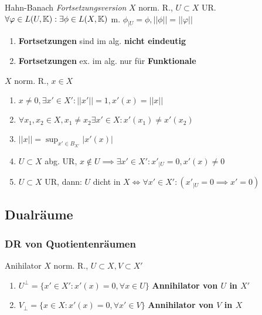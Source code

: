 \begin{satz}{Hahn-Banach \textit{Fortsetzungsversion}}
  $X$ norm. R., $U\subset X$ UR. $\forall \varphi \in L(U,\mathbb{K}):
  \exists \phi \in L(X,\mathbb{K})$ m. $\phi_{|U} = \phi, ||\phi|| = ||\varphi||$
\end{satz}

\begin{bemerkung}
  \begin{enumerate}[label = (\roman*)]
    \item \textbf{Fortsetzungen} sind im alg. \textbf{nicht eindeutig}
    \item \textbf{Fortsetzungen} ex. im alg. nur für  \textbf{Funktionale}
  \end{enumerate}
\end{bemerkung}

\begin{korrolar}
  $X$ norm. R., $x \in X$
  \begin{enumerate}[label = (\roman*)]
    \item $x\neq 0, \exists x' \in X': ||x'|| = 1, x'(x) = ||x||$
    \item $\forall x_1,x_2\in X, x_1 \neq x_2 \exists x' \in X:
      x'(x_1) \neq x'(x_2)$
    \item $||x|| = \sup_{x' \in B_{X'}} |x'(x)|$
    \item $U \subset X$ abg. UR, $x \not\in U \implies \exists x' \in X':
      x'_{|U} = 0, x'(x) \neq 0$
    \item $U \subset X$ UR, dann: $U$ dicht in $X \Leftrightarrow
      \forall x'\in X':(x'_{|U} = 0 \implies x' = 0)$
  \end{enumerate}
\end{korrolar}


\subsection{Dualräume}

\subsubsection*{DR von Quotientenräumen}

\begin{definition}{Anihilator}
  $X$ norm. R., $U \subset X, V\subset X'$

  \begin{enumerate}[label = (\roman*)]
    \item $U^{\perp} = \{x' \in X': x'(x)=0, \forall x\in U\}$
      \textbf{Annihilator von $U$ in $X'$}
    \item $V_{\perp} = \{x \in X: x'(x)=0, \forall x'\in V\}$
      \textbf{Annihilator von $V$ in $X$}
  \end{enumerate}
\end{definition}

